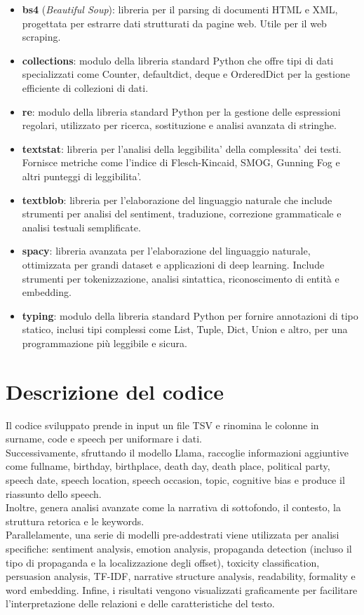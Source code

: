 \documentclass{article}
\begin{document}
\begin{itemize}
	\item \textbf{bs4} (\textit{Beautiful Soup}): libreria per il parsing di documenti HTML e XML, progettata per estrarre dati strutturati da pagine web. Utile per il web scraping.
	\item \textbf{collections}: modulo della libreria standard Python che offre tipi di dati specializzati come Counter, defaultdict, deque e OrderedDict per la gestione efficiente di collezioni di dati.
	\item \textbf{re}: modulo della libreria standard Python per la gestione delle espressioni regolari, utilizzato per ricerca, sostituzione e analisi avanzata di stringhe.
	\item \textbf{textstat}: libreria per l'analisi della leggibilita' della complessita' dei testi. Fornisce metriche come l'indice di Flesch-Kincaid, SMOG, Gunning Fog e altri punteggi di leggibilita'.
	\item \textbf{textblob}: libreria per l'elaborazione del linguaggio naturale che include strumenti per analisi del sentiment, traduzione, correzione grammaticale e analisi testuali semplificate.
	\item \textbf{spacy}: libreria avanzata per l'elaborazione del linguaggio naturale, ottimizzata per grandi dataset e applicazioni di deep learning. Include strumenti per tokenizzazione, analisi sintattica, riconoscimento di entità e embedding.
	\item \textbf{typing}: modulo della libreria standard Python per fornire annotazioni di tipo statico, inclusi tipi complessi come List, Tuple, Dict, Union e altro, per una programmazione più leggibile e sicura.
\end{itemize}

\newpage
\section{Descrizione del codice}
Il codice sviluppato prende in input un file TSV e rinomina le colonne in surname, code e speech per uniformare i dati.\\
Successivamente, sfruttando il modello Llama, raccoglie informazioni aggiuntive come fullname, birthday, birthplace, death day, death place, political party, speech date, speech location, speech occasion, topic, cognitive bias e produce il riassunto dello speech. \\
Inoltre, genera analisi avanzate come la narrativa di sottofondo, il contesto, la struttura retorica e le keywords.\\
Parallelamente, una serie di modelli pre-addestrati viene utilizzata per analisi specifiche: sentiment analysis, emotion analysis, propaganda detection (incluso il tipo di propaganda e la localizzazione degli offset), toxicity classification, persuasion analysis, TF-IDF, narrative structure analysis, readability, formality e word embedding. Infine, i risultati vengono visualizzati graficamente per facilitare l’interpretazione delle relazioni e delle caratteristiche del testo.
\newpage
\end{document}
